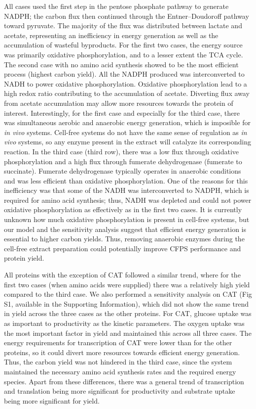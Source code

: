 \documentclass[journal=asbcd6,manuscript=article]{achemso}
\begin{document}
All cases used the first step in the pentose phosphate pathway to generate NADPH;
the carbon flux then continued through the Entner–Doudoroff pathway toward pyruvate.
The majority of the flux was distributed between lactate and acetate, representing an inefficiency in energy generation as well as the accumulation of wasteful byproducts.
For the first two cases, the energy source was primarily oxidative phosphorylation, and to a lesser extent the TCA cycle.
The second case with no amino acid synthesis showed to be the most efficient process (highest carbon yield).
All the NADPH produced was interconverted to NADH to power oxidative phosphorylation.
Oxidative phosphorylation lead to a high redox ratio contributing to the accumulation of acetate.
Diverting flux away from acetate accumulation may allow more resources towards the protein of interest.
Interestingly, for the first case and especially for the third case, there was simultaneous aerobic and anaerobic energy generation, which is imposible for \textit{in vivo} systems.
Cell-free systems do not have the same sense of regulation as \textit{in vivo} systems, so any enzyme present in the extract will catalyze its corresponding reaction.
In the third case (third row), there was a low flux through oxidative phosphorylation and a high flux through fumerate dehydrogenase (fumerate to succinate).
Fumerate dehydrogenase typically operates in anaerobic conditions and was less efficient than oxidative phosphorylation.
One of the reasons for this inefficiency was that some of the NADH was interconverted to NADPH, which is required for amino acid synthesis; thus, NADH was depleted and could not power oxidative phosphorylation as effectively as in the first two cases.
It is currently unknown how much oxidative phosphorylation is present in cell-free systems, but our model and the sensitivity analysis suggest that efficient energy generation is essential to higher carbon yields.
Thus, removing anaerobic enzymes during the cell-free extract preparation could potentially improve CFPS performance and protein yield.

All proteins with the exception of CAT followed a similar trend, where for the first two cases (when amino acids were supplied) there was a relatively high yield compared to the third case.
We also performed a sensitivity analysis on CAT (Fig S1, available in the Supporting Information), which did not show the same trend in yield across the three cases as the other proteins.
For CAT, glucose uptake was as important to productivity as the kinetic parameters.
The oxygen uptake was the most important factor in yield and maintained this across all three cases.
The energy requirements for transcription of CAT were lower than for the other proteins, so it could divert more resources towards efficient energy generation.
Thus, the carbon yield was not hindered in the third case, since the system maintained the necessary amino acid synthesis rates and the required energy species.
Apart from these differences, there was a general trend of transcription and translation being more significant for productivity and substrate uptake being more significant for yield.
\end{document}
